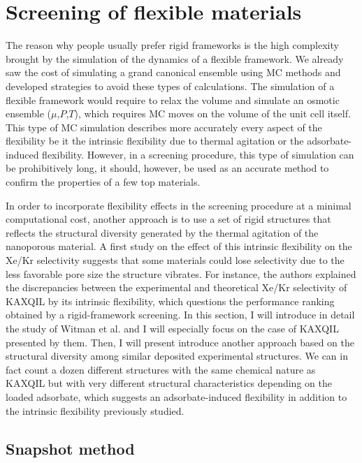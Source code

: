 \documentclass[main]{subfiles}
\begin{document}
\section{Screening of flexible materials}

The reason why people usually prefer rigid frameworks is the high complexity brought by the simulation of the dynamics of a flexible framework. We already saw the cost of simulating a grand canonical ensemble using MC methods and developed strategies to avoid these types of calculations. The simulation of a flexible framework would require to relax the volume and simulate an osmotic ensemble ($\mu$,$P$,$T$), which requires MC moves on the volume of the unit cell itself.\autocite{Bousquet2012} This type of MC simulation describes more accurately every aspect of the flexibility be it the intrinsic flexibility due to thermal agitation or the adsorbate-induced flexibility. However, in a screening procedure, this type of simulation can be prohibitively long, it should, however, be used as an accurate method to confirm the properties of a few top materials. 

In order to incorporate flexibility effects in the screening procedure at a minimal computational cost, another approach is to use a set of rigid structures that reflects the structural diversity generated by the thermal agitation of the nanoporous material. A first study on the effect of this intrinsic flexibility on the Xe/Kr selectivity suggests that some materials could lose selectivity due to the less favorable pore size the structure vibrates.\autocite{Witman_2017} For instance, the authors explained the discrepancies between the experimental and theoretical Xe/Kr selectivity of KAXQIL\autocite{KAXQIL} by its intrinsic flexibility, which questions the performance ranking obtained by a rigid-framework screening. In this section, I will introduce in detail the study of Witman et al.\autocite{Witman_2017} and I will especially focus on the case of KAXQIL presented by them. Then, I will present introduce another approach based on the structural diversity among similar deposited experimental structures. We can in fact count a dozen different structures with the same chemical nature as KAXQIL but with very different structural characteristics depending on the loaded adsorbate, which suggests an adsorbate-induced flexibility in addition to the intrinsic flexibility previously studied. 

\subsection{Snapshot method}
\end{document}
